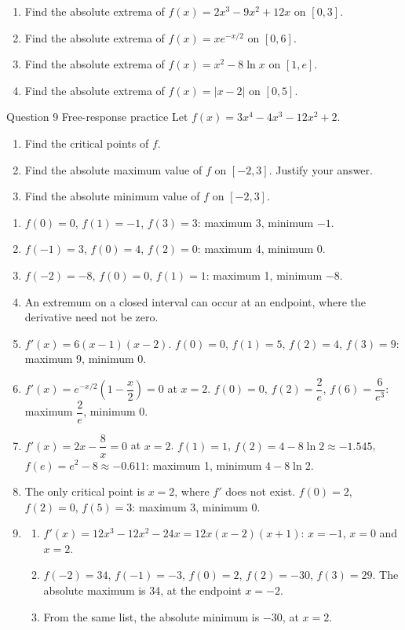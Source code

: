 \documentclass[11pt]{article}
\begin{document}
\begin{enumerate}[leftmargin=*,itemsep=2pt,start=5]
  \item Find the absolute extrema of $f(x)=2x^3-9x^2+12x$ on $[0,3]$.\work{2.8cm}
  \item Find the absolute extrema of $f(x)=xe^{-x/2}$ on $[0,6]$.\work{2.8cm}
  \item Find the absolute extrema of $f(x)=x^2-8\ln x$ on $[1,e]$.\work{2.8cm}
  \item Find the absolute extrema of $f(x)=|x-2|$ on $[0,5]$.\work{2.8cm}
\end{enumerate}

\begin{frbox}{Question 9 \textperiodcentered{} Free-response practice}
Let $f(x)=3x^4-4x^3-12x^2+2$.
\begin{enumerate}[label=(\alph*),leftmargin=*,itemsep=2pt]
  \item Find the critical points of $f$.\work{2.6cm}
  \item Find the absolute maximum value of $f$ on $[-2,3]$. Justify your answer.\work{2.6cm}
  \item Find the absolute minimum value of $f$ on $[-2,3]$.\work{2.6cm}
\end{enumerate}
\end{frbox}

\newpage
\begin{solbox}
\begin{enumerate}[leftmargin=*,itemsep=4pt]
  \item $f(0)=0$, $f(1)=-1$, $f(3)=3$: maximum 3, minimum $-1$.
  \item $f(-1)=3$, $f(0)=4$, $f(2)=0$: maximum 4, minimum 0.
  \item $f(-2)=-8$, $f(0)=0$, $f(1)=1$: maximum 1, minimum $-8$.
  \item An extremum on a closed interval can occur at an endpoint, where the derivative need not be zero.
  \item $f'(x)=6(x-1)(x-2)$. $f(0)=0$, $f(1)=5$, $f(2)=4$, $f(3)=9$: maximum 9, minimum 0.
  \item $f'(x)=e^{-x/2}\left(1-\dfrac x2\right)=0$ at $x=2$. $f(0)=0$, $f(2)=\dfrac2e$, $f(6)=\dfrac{6}{e^3}$: maximum $\dfrac2e$, minimum 0.
  \item $f'(x)=2x-\dfrac8x=0$ at $x=2$. $f(1)=1$, $f(2)=4-8\ln2\approx-1.545$, $f(e)=e^2-8\approx-0.611$: maximum 1, minimum $4-8\ln2$.
  \item The only critical point is $x=2$, where $f'$ does not exist. $f(0)=2$, $f(2)=0$, $f(5)=3$: maximum 3, minimum 0.
  \item \begin{enumerate}[label=(\alph*),leftmargin=*,itemsep=3pt]
    \item $f'(x)=12x^3-12x^2-24x=12x(x-2)(x+1)$: $x=-1$, $x=0$ and $x=2$.
    \item $f(-2)=34$, $f(-1)=-3$, $f(0)=2$, $f(2)=-30$, $f(3)=29$. The absolute maximum is 34, at the endpoint $x=-2$.
    \item From the same list, the absolute minimum is $-30$, at $x=2$.
  \end{enumerate}
\end{enumerate}
\end{solbox}
\end{document}
